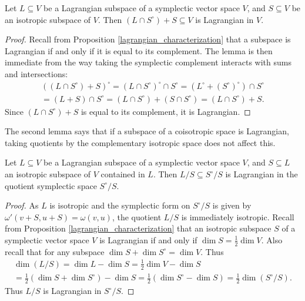 \begin{lemma} \label{restriction_of_lagrangians}
  Let $L \subseteq V$ be a Lagrangian subspace of a symplectic vector space $V$,
  and $S \subseteq V$ be an isotropic subspace of $V$. Then $(L\cap S^\circ) +S
  \subseteq V$ is Lagrangian in $V$.
\end{lemma}
\begin{proof}
  Recall from Proposition \ref{lagrangian_characterization} that a subspace is
  Lagrangian if and only if it is equal to its complement. The lemma is then
  immediate from the way taking the symplectic complement interacts with sums
  and intersections:
  \begin{multline*}
    ((L\cap S^\circ) +S)^\circ = (L\cap S^\circ)^\circ \cap S^\circ = (L^\circ +
    (S^\circ)^\circ) \cap S^\circ \\
    = (L+S) \cap S^\circ = (L \cap S^\circ)+(S
    \cap S^\circ) = (L\cap S^\circ) +S.
  \end{multline*}
  Since $(L\cap S^\circ) +S$ is equal to its complement, it is Lagrangian.
\end{proof}

The second lemma says that if a subspace of a coisotropic space is Lagrangian,
taking quotients by the complementary isotropic space does not affect this.

\begin{lemma} \label{quotients_of_lagrangians}
  Let $L \subseteq V$ be a Lagrangian subspace of a symplectic vector space $V$,
  and $S \subseteq L$ an isotropic subspace of $V$ contained in $L$. Then $L/S
  \subseteq S^\circ/S$ is Lagrangian in the quotient symplectic space
  $S^\circ/S$.
\end{lemma}
\begin{proof}
  As $L$ is isotropic and the symplectic form on $S^\circ/S$ is given by
  $\omega'(v+S,u+S) = \omega(v,u)$, the quotient $L/S$ is immediately isotropic.
  Recall from Proposition \ref{lagrangian_characterization} that an isotropic
  subspace $S$ of a symplectic vector space $V$ is Lagrangian if and only if
  $\dim S = \frac12 \dim V$. Also recall that for any subspace $\dim S + \dim
  S^\circ = \dim V$. Thus
  \begin{multline*}
    \dim(L/S) = \dim L - \dim S = \tfrac12 \dim V - \dim S \\ = \tfrac12(\dim S
    + \dim S^\circ) - \dim S = \tfrac12(\dim S^\circ - \dim S) = \tfrac12
    \dim(S^\circ/S).
  \end{multline*}
  Thus $L/S$ is Lagrangian in $S^\circ/S$.
\end{proof}

